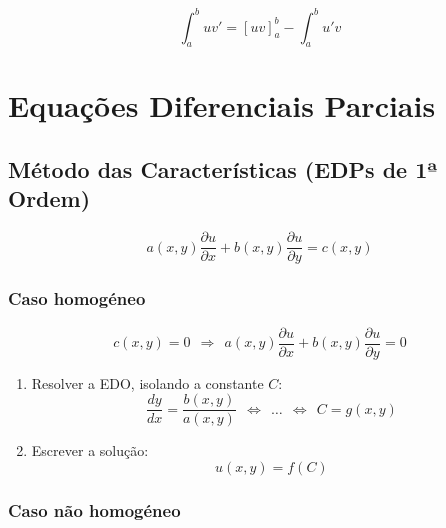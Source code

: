 \documentclass[11pt, a4paper]{article}
\begin{document}
\begin{equation*}
    \int_a^b uv' = [uv] _a^b - \int_a^b u'v
\end{equation*}

\newpage

\section{Equações Diferenciais Parciais}

\subsection{Método das Características (EDPs de 1ª Ordem)}

\begin{equation*}
    a(x,y)\frac{\partial u}{\partial x} + 
    b(x,y)\frac{\partial u}{\partial y} =
    c(x,y)
\end{equation*}

\subsubsection{Caso homogéneo}

\begin{equation*}
    c(x,y) = 0 \ \ \Rightarrow \ \ 
    a(x,y)\frac{\partial u}{\partial x} + 
    b(x,y)\frac{\partial u}{\partial y} = 0
\end{equation*}

\begin{enumerate}
    \item Resolver a EDO, isolando a constante $C$:
    \begin{equation*}
        \frac{dy}{dx} = \frac{b(x,y)}{a(x,y)} \ \ \Leftrightarrow \ \ 
        \ldots \ \ \Leftrightarrow \ \ C = g(x,y)
    \end{equation*}
    \item Escrever a solução:
    \begin{equation*}
        u(x,y) = f(C)
    \end{equation*}
\end{enumerate}

\subsubsection{Caso não homogéneo}
\end{document}
